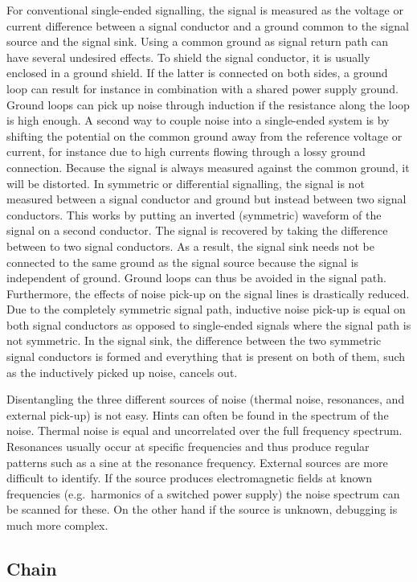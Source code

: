 For conventional single-ended signalling, the signal is measured as the voltage or current difference between a signal conductor and a ground common to the signal source and the signal sink.
Using a common ground as signal return path can have several undesired effects.
To shield the signal conductor, it is usually enclosed in a ground shield.
If the latter is connected on both sides, a ground loop can result for instance in combination with a shared power supply ground.
Ground loops can pick up noise through induction if the resistance along the loop is high enough.
A second way to couple noise into a single-ended system is by shifting the potential on the common ground away from the reference voltage or current, for instance due to high currents flowing through a lossy ground connection.
Because the signal is always measured against the common ground, it will be distorted.
In symmetric or differential signalling, the signal is not measured between a signal conductor and ground but instead between two signal conductors.
This works by putting an inverted (symmetric) waveform of the signal on a second conductor.
The signal is recovered by taking the difference between to two signal conductors.
As a result, the signal sink needs not be connected to the same ground as the signal source because the signal is independent of ground.
Ground loops can thus be avoided in the signal path.
Furthermore, the effects of noise pick-up on the signal lines is drastically reduced.
Due to the completely symmetric signal path, inductive noise pick-up is equal on both signal conductors as opposed to single-ended signals where the signal path is not symmetric.
In the signal sink, the difference between the two symmetric signal conductors is formed and everything that is present on both of them, such as the inductively picked up noise, cancels out.

Disentangling the three different sources of noise (thermal noise, resonances, and external pick-up) is not easy.
Hints can often be found in the spectrum of the noise.
Thermal noise is equal and uncorrelated over the full frequency spectrum.
Resonances usually occur at specific frequencies and thus produce regular patterns such as a sine at the resonance frequency.
External sources are more difficult to identify.
If the source produces electromagnetic fields at known frequencies (e.g.\ harmonics of a switched power supply) the noise spectrum can be scanned for these.
On the other hand if the source is unknown, debugging is much more complex.


\subsection*{\AT Chain}


